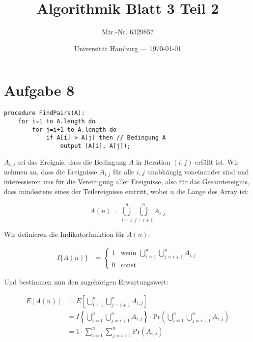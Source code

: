 \documentclass[parskip=half,a4paper]{scrartcl}
\title{Algorithmik Blatt 3 Teil 2}
\author{Mtr.-Nr. 6329857}
\date{Universität Hamburg --- \today}
\begin{document}
\maketitle %

\linenumbers

\section*{Aufgabe 8}

\begin{verbatim}
procedure FindPairs(A):
    for i=1 to A.length do
        for j=i+1 to A.length do
            if A[i] > A[j] then // Bedingung A
                output (A[i], A[j]);
\end{verbatim}


$A_{i,j}$ sei das Ereignis, dass die Bedingung $A$ in Iteration $(i,j)$ erfüllt ist. Wir nehmen an, dass die Ereignisse $A_{i,j}$ für alle $i,j$ unabhängig voneinander sind und interessieren uns für die Vereinigung aller Ereignisse, also für das Gesamtereignis, dass mindestens eines der Teilereignisse eintritt, wobei $n$ die Länge des Array ist:

\begin{equation}
A(n) = \bigcup_{i=1}^{n}{\bigcup_{j=i+1}^n}A_{i,j}
\end{equation}

Wir definieren die Indikatorfunktion für $A(n)$:

\begin{equation}
\begin{aligned}
I\{A(n)\} &= \begin{cases}
1 & \text{wenn $\bigcup_{i=1}^{n}{\bigcup_{j=i+1}^n}A_{i,j}$}\\
0 & \text{sonst}
\end{cases}
\end{aligned}
\end{equation}

Und bestimmen nun den zugehörigen Erwartungswert:

\begin{equation}
\begin{aligned}
   E\left[A(n)\right] &= E\left[\bigcup_{i=1}^n{\bigcup_{j=i+1}^n}A_{i,j}\right] \\
    &= I\left\{\bigcup_{i=1}^n{\bigcup_{j=i+1}^n}A_{i,j}\right \} \cdot \text{Pr}\left(\bigcup_{i=1}^n{\bigcup_{j=i+1}^n}A_{i,j}\right) \\
   &= 1 \cdot \sum_{i=1}^n{\sum_{j=i+1}^n}\text{Pr}\left(A_{i,j}\right)
\end{aligned}
\end{equation}
\end{document}
